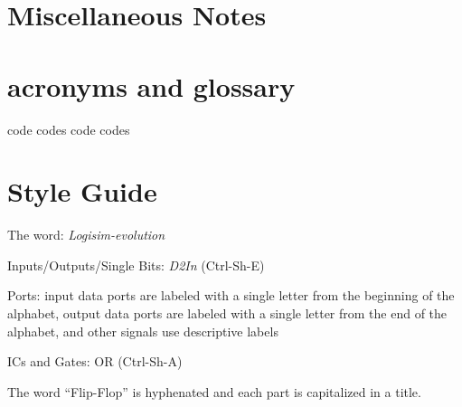 \section{Miscellaneous Notes}

\section{acronyms and glossary}

\gls{code} %
\glspl{code} %
\Gls{code} %
\Glspl{code} %


\section{Style Guide}
\item The word: \textit{Logisim-evolution}
\item Inputs/Outputs/Single Bits: \emph{D2In} (Ctrl-Sh-E)
\item Ports: input data ports are labeled with a single letter from the beginning of the alphabet, output data ports are labeled with a single letter from the end of the alphabet, and other signals use descriptive labels
\item ICs and Gates: \textsf{OR} (Ctrl-Sh-A)
\item The word ``Flip-Flop'' is hyphenated and each part is capitalized in a title.

